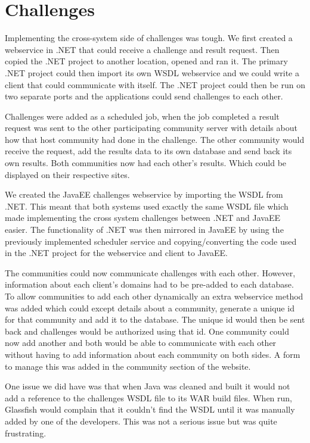 \section{Challenges}
Implementing the cross-system side of challenges was tough. We first created a webservice in .NET that could receive a challenge and result request. Then copied the .NET project to another location, opened and ran it. The primary .NET project could then import its own WSDL webservice and we could write a client that could communicate with itself. The .NET project could then be run on two separate ports and the applications could send challenges to each other. \par
Challenges were added as a scheduled job, when the job completed a result request was sent to the other participating community server with details about how that host community had done in the challenge. The other community would receive the request, add the results data to its own database and send back its own results. Both communities now had each other’s results. Which could be displayed on their respective sites. \par
We created the JavaEE challenges webservice by importing the WSDL from .NET. This meant that both systems used exactly the same WSDL file which made implementing the cross system challenges between .NET and JavaEE easier. The functionality of .NET was then mirrored in JavaEE by using the previously implemented scheduler service and copying/converting the code used in the .NET project for the webservice and client to JavaEE. \par
The communities could now communicate challenges with each other. However, information about each client’s domains had to be pre-added to each database. To allow communities to add each other dynamically an extra webservice method was added which could except details about a community, generate a unique id for that community and add it to the database. The unique id would then be sent back and challenges would be authorized using that id. One community could now add another and both would be able to communicate with each other without having to add information about each community on both sides. A form to manage this was added in the community section of the website. \par
One issue we did have was that when Java was cleaned and built it would not add a reference to the challenges WSDL file to its WAR build files. When run, Glassfish would complain that it couldn’t find the WSDL until it was manually added by one of the developers. This was not a serious issue but was quite frustrating. \par
